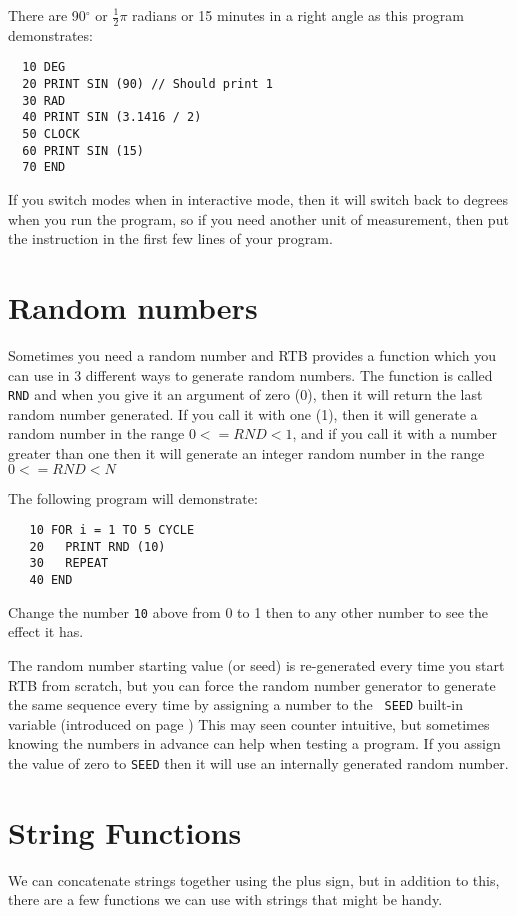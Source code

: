 There are 90$^{\circ}$ or $\frac{1}{2}\pi$ radians or 15
minutes in a right angle as this program demonstrates:
\begin{verbatim}
  10 DEG
  20 PRINT SIN (90) // Should print 1
  30 RAD
  40 PRINT SIN (3.1416 / 2)
  50 CLOCK
  60 PRINT SIN (15)
  70 END
\end{verbatim}

If \meek you switch modes when in interactive mode, then it will switch
back to degrees when you run the program, so if you need another
unit of measurement, then put the instruction in the first few lines
of your program.

\section{Random numbers}
Sometimes you need a random number and RTB provides a function which you
can use in 3 different ways to generate random numbers. The function
is called {\tt RND} and when you give it
an argument of zero (0), then it will return the last random number
generated. If you call it with one (1), then it will generate a random
number in the range {\tt $0 <= RND < 1$}, and if you call it with a
number greater than one then it will generate an integer random number
in the range {\tt $0 <= RND < N$}

The following program will demonstrate:
\begin{verbatim}
   10 FOR i = 1 TO 5 CYCLE
   20   PRINT RND (10)
   30   REPEAT
   40 END
\end{verbatim}
Change the number {\tt 10} above from 0 to 1 then to any other number
to see the effect it has.

The random number starting value (or seed) is re-generated every time you
start RTB from scratch, but you can force the random number generator to
generate the same sequence every time by assigning a number to the {\tt
SEED} built-in variable (introduced on page
) This may seen counter intuitive, but sometimes
knowing the numbers in advance can help when testing a program. If you
assign the value of zero to {\tt SEED} then it will use an internally
generated random number.

\section{String Functions}
We can concatenate strings together using the plus sign, but in addition
to this, there are a few functions we can use with strings that might
be handy.

